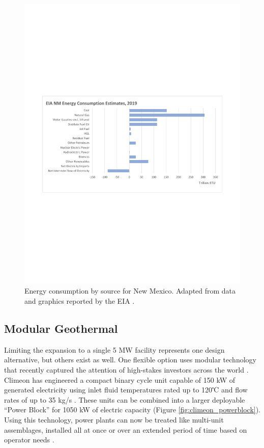 \begin{figure}[!htp]
\centering
\includegraphics[width=\textwidth]{templates/images/Figure-EIA_NM_Energy_Consumption.pdf}
\caption[New Mexico energy consumption]{Energy consumption by source for New Mexico. Adapted from data and graphics reported by the EIA \protect\citep{eia_new_2021}.}
\label{fig:nm_energy_consumption}
\end{figure}

\subsection{Modular Geothermal}\label{ch4:modular_geothermal}
Limiting the expansion to a single 5 MW facility represents one design alternative, but others exist as well. One flexible option uses modular technology that recently captured the attention of high-stakes investors across the world \citep{shieber_bill_2019}. Climeon has engineered a compact binary cycle unit capable of 150 kW of generated electricity using inlet fluid temperatures rated up to 120℃ and flow rates of up to 35 kg/s \citep{climeon_climeon_2021-1}. These units can be combined into a larger deployable ``Power Block'' for 1050 kW of electric capacity \citep{winther_power_2018} (Figure \ref{fig:climeon_powerblock}). Using this technology, power plants can now be treated like multi-unit assemblages, installed all at once or over an extended period of time based on operator needs \citep{climeon_why_2018}.

